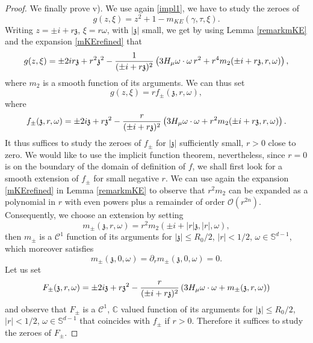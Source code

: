 \documentclass[11pt]{amsart}
\numberwithin{equation}{section}
\begin{document}
\begin{proof}
We finally prove v). We use again \eqref{impl1}, we have to study the zeroes of
$$ g(z, \xi)=  z^2 + 1 - m_{KE}(\gamma, \tau, \xi).$$
 Writing $z = \pm i +   r \mathfrak{z}$, $\xi= r \omega$, with $| \mathfrak{z}|$ small,  we get by using 
 Lemma \ref{remarkmKE} and the expansion \eqref{mKErefined} that 
 \begin{equation}
\label{defm2}
 g(z,\xi)=  \pm 2 i r  \mathfrak{z} + r^2  \mathfrak{z}^2  -  {1 \over  (\pm i + r  \mathfrak{z})^2} \left( 3 H_{\mu}\omega \cdot \omega\,  r^2  + r^4 m_{2}(\pm i  + r  \mathfrak{z}, r, \omega) \right),
\end{equation}
 where $m_{2}$ is a smooth function of its arguments. We can thus set
 $$ g(z,\xi)
 = r f_{\pm}( \mathfrak{z}, r, \omega),$$
  where 
  \begin{equation}
  \label{f+def}f_{\pm}( \mathfrak{z}, r, \omega) =  \pm 2 i   \mathfrak{z} + r  \mathfrak{z}^2  -  { r \over  (\pm i + r  \mathfrak{z})^2} \left( 3 H_{\mu} \omega \cdot \omega+   r^2 m_{2}(\pm i  + r  \mathfrak{z}, r, \omega)\right).
  \end{equation}
  It thus suffices to study the zeroes of $f_{\pm}$ for $| \mathfrak{z} |$ sufficiently small, $r>0$ close to zero.
   We would like to use the implicit function theorem, nevertheless, since $r=0$ is on the boundary of the domain of definition
    of $f$, we shall first look for a smooth  extension of $f_{\pm}$  for small negative $r$.
     We can use again the expansion \eqref{mKErefined} in Lemma \ref{remarkmKE}  to observe that
    $r^2 m_{2}$ can be expanded as a polynomial in $r$ with even powers plus a remainder of order $\mathcal{O}(r^{2n})$.
     Consequently, we choose an extension by setting 
   $$ m_{\pm}( \mathfrak{z}, r, \omega)=  r^2 {m}_{2} (\pm i  + |r|  \mathfrak{z}, |r| , \omega), $$
then $m_{\pm}$ is a $\mathscr{C}^1$ function %
of its arguments for $| \mathfrak{z}| \leq R_{0}/2$, $|r|<1/2$, $\omega \in \mathbb{S}^{d-1}$, which moreover satisfies
\begin{equation}
\label{flat}
m_{\pm}( \mathfrak{z},0, \omega )  = \partial_{r}m_{\pm}( \mathfrak{z},0, \omega )= 0.
\end{equation}
Let us set
$$ F_{\pm} ( \mathfrak{z}, r, \omega) =  \pm 2 i   \mathfrak{z} + r  \mathfrak{z}^2  -  { r \over  (\pm i + r  \mathfrak{z})^2} \left(  3H_{\mu} \omega \cdot \omega +  m_{\pm}( \mathfrak{z}, r, \omega)\right)$$
and observe that $F_{\pm}$ is a  $\mathscr{C}^1$, $\mathbb{C}$ valued  function of its arguments for $| \mathfrak{z}| \leq R_{0}/2$, $|r|<1/2$, $\omega \in \mathbb{S}^{d-1}$ that coincides with $f_{\pm}$ if $r >0$. Therefore it suffices to study the zeroes of $F_{\pm}$.

\end{proof}
\end{document}
